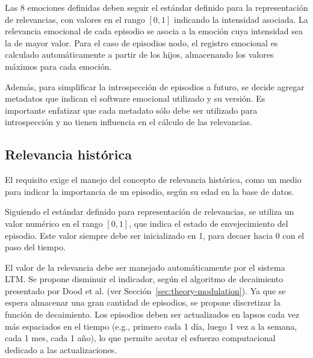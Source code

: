 Las 8 emociones definidas deben seguir el estándar definido para la representación de relevancias, con valores en el rango $[0, 1]$ indicando la intensidad asociada. La relevancia emocional de cada episodio se asocia a la emoción cuya intensidad sea la de mayor valor. Para el caso de episodios nodo, el registro emocional es calculado automáticamente a partir de los hijos, almacenando los valores máximos para cada emoción.

Además, para simplificar la introspección de episodios a futuro, se decide agregar metadatos que indican el software emocional utilizado y su versión. Es importante enfatizar que cada metadato sólo debe ser utilizado para introspección y no tienen influencia en el cálculo de las relevancias.


\subsection{Relevancia histórica}\label{sec:design_ep_rel_hist}

El requisito  exige el manejo del concepto de relevancia histórica, como un medio para indicar la importancia de un episodio, según su edad en la base de datos. 

Siguiendo el estándar definido para representación de relevancias, se utiliza un valor numérico en el rango $[0, 1]$, que indica el estado de envejecimiento del episodio. Este valor siempre debe ser inicializado en 1, para decaer hacia 0 con el paso del tiempo.

El valor de la relevancia debe ser manejado automáticamente por el sistema LTM. Se propone disminuir el indicador, según el algoritmo de decaimiento presentado por Dood et al. (ver Sección~\ref{sec:theory-modulation}). Ya que se espera almacenar una gran cantidad de episodios, se propone discretizar la función de decaimiento. Los episodios deben ser actualizados en lapsos cada vez más espaciados en el tiempo (e.g., primero cada 1 día, luego 1 vez a la semana, cada 1 mes, cada 1 año), lo que permite acotar el esfuerzo computacional dedicado a las actualizaciones.


